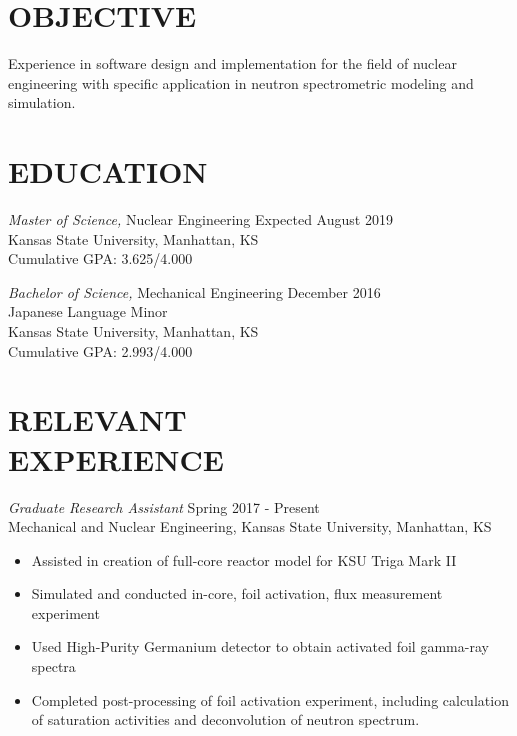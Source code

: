 \documentclass[margin, 10pt]{res} %
\begin{document}
\begin{resume}
 
\section{OBJECTIVE}  

Experience in software design and implementation for the field of nuclear engineering with specific application in neutron spectrometric modeling and simulation.

\section{EDUCATION}

{\sl Master of Science,} Nuclear Engineering \hfill Expected August 2019\\
Kansas State University, Manhattan, KS \\
Cumulative GPA: 3.625/4.000

{\sl Bachelor of Science,} Mechanical Engineering \hfill December 2016 \\
Japanese Language Minor \\
Kansas State University, Manhattan, KS \\
Cumulative GPA: 2.993/4.000


\section{RELEVANT \\ EXPERIENCE}

{\sl Graduate Research Assistant} \hfill Spring 2017 - Present \\
Mechanical and Nuclear Engineering, Kansas State University, Manhattan, KS
\begin{itemize}
    \item Assisted in creation of full-core reactor model for KSU Triga Mark II
    \item Simulated and conducted in-core, foil activation, flux measurement experiment
    \item Used High-Purity Germanium detector to obtain activated foil gamma-ray spectra
    \item Completed post-processing of foil activation experiment, including calculation of saturation activities and deconvolution of neutron spectrum.
\end{itemize}


\end{resume}
\end{document}

